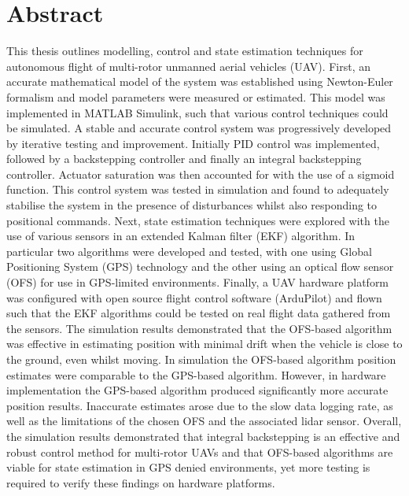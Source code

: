 
\chapter*{Abstract}\label{Abstract}
This thesis outlines modelling, control and state estimation techniques for autonomous flight of multi-rotor unmanned aerial vehicles (UAV). First, an accurate mathematical model of the system was established using Newton-Euler formalism and model parameters were measured or estimated. This model was implemented in MATLAB Simulink, such that various control techniques could be simulated. A stable and accurate control system was progressively developed by iterative testing and improvement. Initially PID control was implemented, followed by a backstepping controller and finally an integral backstepping controller. Actuator saturation was then accounted for with the use of a sigmoid function. This control system was tested in simulation and found to adequately stabilise the system in the presence of disturbances whilst also responding to positional commands. Next, state estimation techniques were explored with the use of various sensors in an extended Kalman filter (EKF) algorithm. In particular two algorithms were developed and tested, with one using Global Positioning System (GPS) technology and the other using an optical flow sensor (OFS) for use in GPS-limited environments. Finally, a UAV hardware platform was configured with open source flight control software (ArduPilot) and flown such that the EKF algorithms could be tested on real flight data gathered from the sensors. The simulation results demonstrated that the OFS-based algorithm was effective in estimating position with minimal drift when the vehicle is close to the ground, even whilst moving. In simulation the OFS-based algorithm position estimates were comparable to the GPS-based algorithm. However, in hardware implementation the GPS-based algorithm produced significantly more accurate position results. Inaccurate estimates arose due to the slow data logging rate, as well as the limitations of the chosen OFS and the associated lidar sensor. Overall, the simulation results demonstrated that integral backstepping is an effective and robust control method for multi-rotor UAVs and that OFS-based algorithms are viable for state estimation in GPS denied environments, yet more testing is required to verify these findings on hardware platforms.
\clearpage


